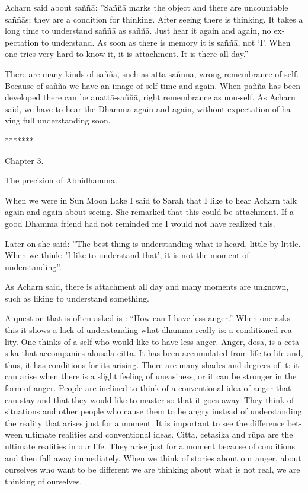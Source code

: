 \textdutch{Acharn said about saññā: ''Saññā marks the object and there
are uncountable saññās; they are a condition for thinking. After seeing
there is thinking. It takes a long time to understand saññā as saññā.
Just hear it again and again, no expectation to understand. As soon as
there is memory it is saññā, not `I'. When one tries very hard to know
it, it is attachment. It is there all day.''}

\textdutch{There are many kinds of saññā, such as attā-sañnnā, wrong
remembrance of self. Because of saññā we have an image of self time and
again. When paññā has been developed there can be anattā-saññā, right
remembrance as non-self. As Acharn said, we have to hear the Dhamma
again and again, without expectation of having full understanding soon.
}

\textdutch{*******}

\textdutch{Chapter 3. }

\textdutch{The precision of Abhidhamma.}

\textdutch{When we were in Sun Moon Lake I said to Sarah that I like to
hear Acharn talk again and again about seeing. She remarked that this
could be attachment. If a good Dhamma friend had not reminded me I would
not have realized this. }

\textdutch{Later on she said: ''The best thing is understanding what is
heard, little by little. When we think: 'I like to understand that', it
is not the moment of understanding''. }

\textdutch{As Acharn said, there is attachment all day and many moments
are unknown, such as liking to understand something. }

\textdutch{A question that is often asked is : ``How can I have less
anger.'' When one asks this it shows a lack of understanding what dhamma
really is: a conditioned reality. One thinks of a self who would like to
have less anger. Anger, dosa, is a cetasika that accompanies akusala
citta. It has been accumulated from life to life and, thus, it has
conditions for its arising. There are many shades and degrees of it: it
can arise when there is a slight feeling of uneasiness, or it can be
stronger in the form of anger. People are inclined to think of a
conventional idea of anger that can stay and that they would like to
master so that it goes away. They think of situations and other people
who cause them to be angry instead of understanding the reality that
arises just for a moment. It is important to see the difference between
ultimate realities and conventional ideas. Citta, cetasika and rūpa are
the ultimate realities in our life. They arise just for a moment because
of conditions and then fall away immediately. When we think of stories
about our anger, about ourselves who want to be different we are
thinking about what is not real, we are thinking of ourselves.}

